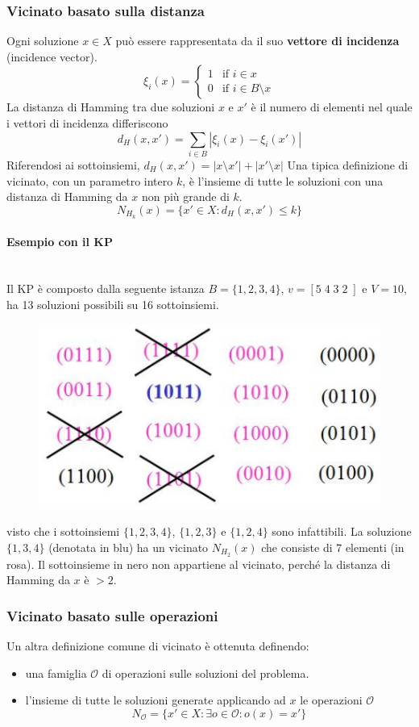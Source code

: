 \documentclass{article}
\begin{document}
\subsubsection{Vicinato basato sulla distanza}
Ogni soluzione $x\in X$ può essere rappresentata da il suo \textbf{vettore di incidenza} (incidence
vector).
\[
    \xi_i(x)=
    \begin{cases}
        1 & \text{if }i\in x            \\
        0 & \text{if }i\in B\setminus x
    \end{cases}
\]
La distanza di Hamming tra due soluzioni $x$ e $x'$ è il numero di elementi nel quale i vettori
di incidenza differiscono
$$d_H(x,x')=\sum_{i\in B}|\xi_i(x) -\xi_i(x')|$$
Riferendosi ai sottoinsiemi, $d_H(x,x')=|x\setminus x'| + |x'\setminus x|$
Una tipica definizione di vicinato, con un parametro intero $k$, è l'insieme di tutte le soluzioni
con una distanza di Hamming da $x$ non più grande di $k$.
$$N_{H_k}(x)=\{x'\in X: d_H(x,x')\leq k\}$$

\paragraph{Esempio con il KP}\mbox{}\\
Il KP è composto dalla seguente istanza $B=\{1,2,3,4\}$, $v=[5\;4\;3\;2\;]$ e $V=10$, ha 13
soluzioni possibili su 16 sottoinsiemi.
\begin{figure}[H]
    \centering
    \includegraphics[scale=0.5]{images/kp_algo_instvec.png}
\end{figure}
visto che i sottoinsiemi $\{1,2,3,4\}$, $\{1,2,3\}$ e $\{1,2,4\}$ sono infattibili. La soluzione
$\{1,3,4\}$ (denotata in blu) ha un vicinato $N_{H_2}(x)$ che consiste di 7 elementi (in rosa).
Il sottoinsieme in nero non appartiene al vicinato, perché la distanza di Hamming da $x$ è $>2$.

\subsubsection{Vicinato basato sulle operazioni}
Un altra definizione comune di vicinato è ottenuta definendo:
\begin{itemize}
    \item una famiglia $\mathcal{O}$ di operazioni sulle soluzioni del problema.
    \item l'insieme di tutte le soluzioni generate applicando ad $x$ le operazioni $\mathcal{O}$
          $$N_{\mathcal{O}}=\{x'\in X:\exists o\in\mathcal{O} : o(x)=x'\}$$
\end{itemize}
\end{document}
